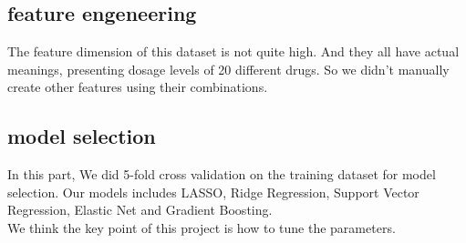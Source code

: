\documentclass{article}
\begin{document}
\subsection{feature engeneering}
The feature dimension of this dataset is not quite high. And they all have actual meanings, presenting dosage levels of 20 different drugs. So we didn't manually create other features using their combinations.

\subsection{model selection}
In this part, We did 5-fold cross validation on the training dataset for model selection. Our models includes LASSO, Ridge Regression, Support Vector Regression, Elastic Net and Gradient Boosting. \\
We think the key point of this project is how to tune the parameters.
\end{document}
